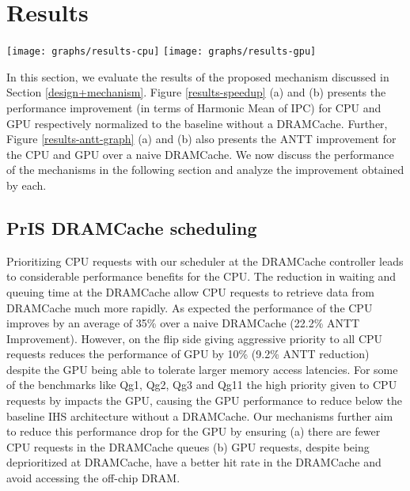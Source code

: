 \section{Results} \label{results}
\begin{figure*}[!htb]
    \centering
    \texttt{[image: graphs/results-cpu]}
    \texttt{[image: graphs/results-gpu]}
    \caption{Speedups obtained by adding a stacked DRAMCache for (a) CPU (b) GPU}
    \label{results-speedup}
\end{figure*}

In this section, we evaluate the results of the proposed \cachename mechanism discussed in Section \ref{design+mechanism}. Figure \ref{results-speedup} (a) and (b) presents the performance improvement (in terms of Harmonic Mean of IPC) for CPU and GPU respectively normalized to the baseline without a DRAMCache. Further, Figure \ref{results-antt-graph} (a) and (b) also presents the ANTT improvement for the CPU and GPU over a naive DRAMCache. We now discuss the performance of the \cachename mechanisms in the following section and analyze the improvement obtained by each.

\subsection{PrIS DRAMCache scheduling}
Prioritizing CPU requests with our \prioname scheduler at the DRAMCache controller leads to considerable performance benefits for the CPU. The reduction in waiting and queuing time at the DRAMCache allow CPU requests to retrieve data from DRAMCache much more rapidly. As expected the performance of the CPU improves by an average of 35\% over a naive DRAMCache (22.2\% ANTT Improvement). However, on the flip side giving aggressive priority to all CPU requests reduces the performance of GPU by 10\% (9.2\% ANTT reduction) despite the GPU being able to tolerate larger memory access latencies. For some of the benchmarks like Qg1, Qg2, Qg3 and Qg11 the high priority given to CPU requests by \prioname impacts the GPU, causing the GPU performance to reduce below the baseline IHS architecture without a DRAMCache. Our mechanisms further aim to reduce this performance drop for the GPU by ensuring (a) there are fewer CPU requests in the DRAMCache queues (b) GPU requests, despite being deprioritized at DRAMCache, have a better hit rate in the DRAMCache and avoid accessing the off-chip DRAM.
